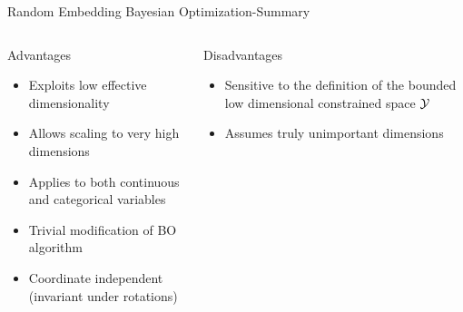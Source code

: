 \begin{frame}{Random Embedding Bayesian Optimization-Summary}
\begin{columns}[T] %
\begin{column}{.48\textwidth}


    \begin{block}{Advantages}
    \begin{itemize}
    	\item Exploits low effective dimensionality 
    	\item Allows scaling to very high dimensions
    	\item Applies to both continuous and categorical variables
    	\item Trivial modification of BO algorithm
    	\item Coordinate independent (invariant under rotations)
    \end{itemize}
    \end{block}
\pause
\end{column}%

\hfill%

\begin{column}{.48\textwidth}

    \begin{block}{Disadvantages}
    \begin{itemize}
    	\item Sensitive to the definition of the bounded low dimensional constrained space $\mathcal{Y}$
    	\item Assumes truly unimportant dimensions
    \end{itemize}
\end{block}

\end{column}
\end{columns}   
\end{frame}

